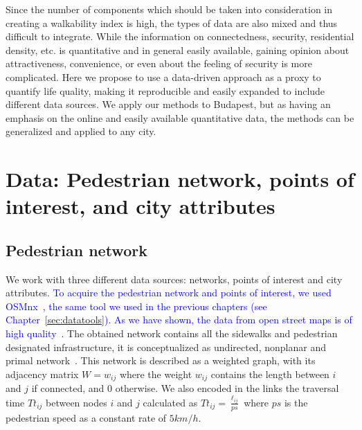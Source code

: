 Since the number of components which should be taken into consideration in creating a walkability index is high, the types of data are also mixed and thus difficult to integrate. While the information on connectedness, security, residential density, etc. is quantitative and in general easily available, gaining opinion about attractiveness, convenience, or even about the feeling of security is more complicated. Here we propose to use a data-driven approach as a proxy to quantify life quality, making it reproducible and easily expanded to include different data sources. We apply our methods to Budapest, but as having an emphasis on the online and easily available quantitative data, the methods can be generalized and applied to any city.

\section{Data: Pedestrian network, points of interest, and city attributes}
\subsection{Pedestrian network}
We work with three different data sources: networks, points of interest and city attributes. \textcolor{blue}{To acquire the pedestrian network and points of interest, we used OSMnx~\cite{boeing2017osmnx}, the same tool we used in the previous chapters (see Chapter~\ref{sec:datatools}). As we have shown, the data from open street maps is of high quality~\cite{haklay2010openstreetmap,girres2010quality,Ferster2019Bicycle,barbosa2018human}.}%
The obtained network contains all the sidewalks and pedestrian designated infrastructure, it is conceptualized as undirected, nonplanar and primal network~\cite{porta2006primal}. This network is described as a weighted graph, with its adjacency matrix $W=w_{ij}$ where the weight $w_{ij}$ contains the length between $i$ and $j$ if connected, and $0$ otherwise. We also encoded in the links the traversal time $Tt_{ij}$ between nodes $i$ and $j$ calculated as $Tt_{ij}=\frac{\ell_{ij}}{ps}$ where $ps$ is the pedestrian speed as a constant rate of $5km/h$.

